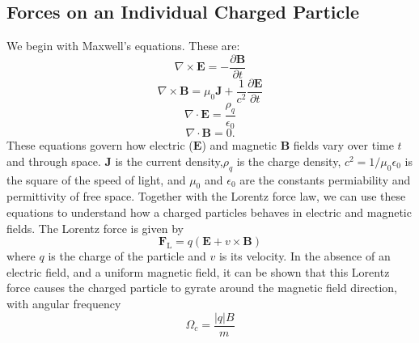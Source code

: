 \subsection{Forces on an Individual Charged Particle}
We begin with Maxwell's equations. These are:
\begin{equation}
\nabla \times \boldsymbol{E} = -\frac{\partial \boldsymbol{B}}{\partial t}
\end{equation}
\begin{equation}
\nabla \times \boldsymbol{B} = \mu_0 \boldsymbol{J} + \frac{1}{c^2}\frac{\partial \boldsymbol{E}}{\partial t}
\end{equation}
\begin{equation}
\nabla \cdot \boldsymbol{E} =  \frac{\rho_q}{\epsilon_0} 
\end{equation}
\begin{equation}
\nabla \cdot \boldsymbol{B} =  0.
\end{equation}
These equations govern how electric ($\boldsymbol{E}$) and magnetic $\boldsymbol{B}$ fields vary over time $t$ and through space. $\boldsymbol{J}$ is the current density,$\rho_q$ is the charge density, $c^2 = 1/\mu_0 \epsilon_0$ is the square of the speed of light, and $\mu_0$ and $\epsilon_0$ are the constants permiability and permittivity of free space. Together with the Lorentz force law, we can use these equations to understand how a charged particles behaves in electric and magnetic fields. The Lorentz force is given by 
\begin{equation}\label{intro:eq:lorentz}
\boldsymbol{F}_\mathrm{L} = q(\boldsymbol{E} + v \times \boldsymbol{B})
\end{equation}
where $q$ is the charge of the particle and $v$ is its velocity. In the absence of an electric field, and a uniform magnetic field, it can be shown that this Lorentz force causes the charged particle to gyrate around the magnetic field direction, with angular frequency
\begin{equation}
\Omega_c = \frac{|q|B}{m}
\end{equation}
